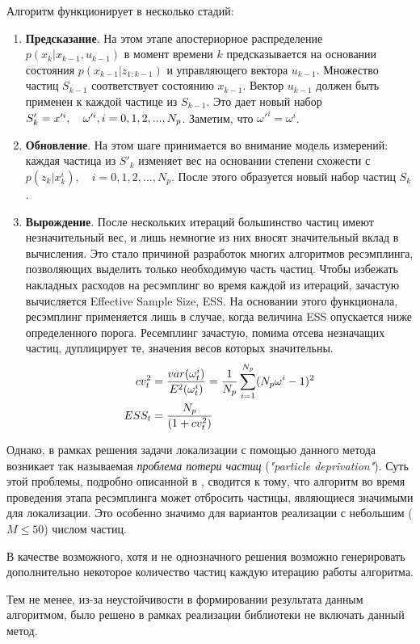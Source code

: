 Алгоритм функционирует в несколько стадий:
\begin{enumerate}
    \item
    \textbf{Предсказание}. На этом этапе апостериорное распределение \\$p(x_k | x_{k-1}, u_{k-1})$ в момент времени $k$ предсказывается на основании состояния $p(x_{k-1} | z_{1:k-1})$ и управляющего вектора $u_{k-1}$. Множество частиц $S_{k-1}$ соответствует состоянию $x_{k-1}$. Вектор $u_{k-1}$ должен быть применен к каждой частице из $S_{k-1}$. Это дает новый набор $S'_k = x'^i, \quad \omega'^i, \\ i=0,1,2,..., N_p$. Заметим, что $\omega'^i = \omega^i$.
    \item
    \textbf{Обновление}. На этом шаге принимается во внимание модель измерений: каждая частица из $S'_k$ изменяет вес на основании степени схожести с $p(z_k | x^i_k), \quad i=0,1,2,...,N_p$. После этого образуется новый набор частиц $S_k$.
    \item
    \textbf{Вырождение}. После нескольких итераций большинство частиц имеют незначительный вес, и лишь немногие из них вносят значительный вклад в вычисления. Это стало причиной разработок многих алгоритмов ресэмплинга, позволяющих выделить только необходимую часть частиц. Чтобы избежать накладных расходов на ресэмплинг во время каждой из итераций, зачастую вычисляется Effective Sample Size, ESS. На основании этого функционала, ресэмплинг применяется лишь в случае, когда величина ESS опускается ниже определенного порога. Ресемплинг зачастую, помима отсева незначащих частиц, дуплицирует те, значения весов которых значительны.
    \begin{align}
        cv_t^2 &= \frac{var(\omega_t^i)}{ E^2(\omega_t^i) } = \frac{1}{N_p} \sum_{i=1}^{N_p} (N_p \omega^i - 1)^2 \notag \\
        ESS_t &= \frac{N_p}{(1+cv_t^2)} \notag
    \end{align}
\end{enumerate}

Однако, в рамках решения задачи локализации с помощью данного метода возникает так называемая \textit{проблема потери частиц} (\textit{"particle deprivation"}). Суть этой проблемы, подробно описанной в \cite{thrun2001robust}, сводится к тому, что алгоритм во время проведения этапа ресэмплинга может отбросить частицы, являющиеся значимыми для локализации. Это особенно значимо для вариантов реализации с небольшим ($M \leq 50$) числом частиц.

В качестве возможного, хотя и не однозначного решения возможно генерировать дополнительно некоторое количество частиц каждую итерацию работы алгоритма. 

Тем не менее, из-за неустойчивости в формировании результата данным алгоритмом, было решено в рамках реализации библиотеки не включать данный метод.